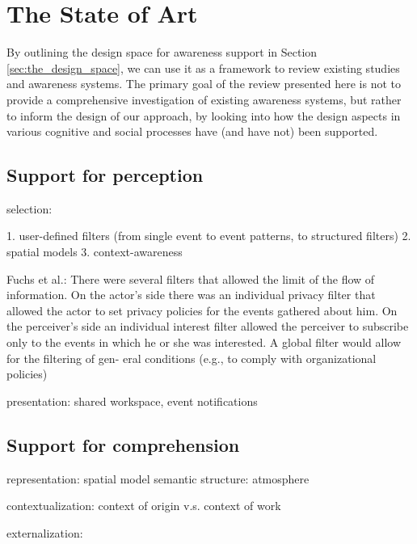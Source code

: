 
\section{The State of Art} %
\label{sec:the_state_of_art}
By outlining the design space for awareness support in Section \ref{sec:the_design_space}, we can use it as a framework to review existing studies and awareness systems. The primary goal of the review presented here is not to provide a comprehensive investigation of existing awareness systems, but rather to inform the design of our approach, by looking into how the design aspects in various cognitive and social processes have (and have not) been supported.

\subsection{Support for perception} %
\label{sub:support_for_perception}
selection: 

1. user-defined filters (from single event to event patterns, to structured filters)
2. spatial models
3. context-awareness

Fuchs et al.: There were several filters that allowed the limit of the flow of information. On the actor’s side there was an individual privacy filter that allowed the actor to set privacy policies for the events gathered about him. On the perceiver’s side an individual interest filter allowed the perceiver to subscribe only to the events in which he or she was interested. A global filter would allow for the filtering of gen- eral conditions (e.g., to comply with organizational policies)



presentation: shared workspace, event notifications


\subsection{Support for comprehension} %
\label{sub:support_for_comprehension}
representation:
spatial model
semantic structure: atmosphere

contextualization: 
context of origin v.s. context of work

externalization:


